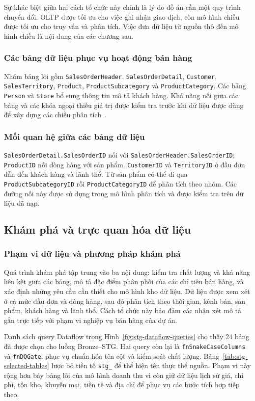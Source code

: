 Sự khác biệt giữa hai cách tổ chức này chính là lý do đồ án cần một quy trình chuyển đổi. OLTP được tối ưu cho việc ghi nhận giao dịch, còn mô hình chiều được tối ưu cho truy vấn và phân tích. Việc đưa dữ liệu từ nguồn thô đến mô hình chiều là nội dung của các chương sau.

\subsubsection{Các bảng dữ liệu phục vụ hoạt động bán hàng}
Nhóm bảng lõi gồm \texttt{SalesOrderHeader}, \texttt{SalesOrderDetail}, \texttt{Customer}, \texttt{SalesTerritory}, \texttt{Product}, \texttt{ProductSubcategory} và \texttt{ProductCategory}. Các bảng \texttt{Person} và \texttt{Store} bổ sung thông tin mô tả khách hàng. Khả năng nối giữa các bảng và các khóa ngoại thiếu giá trị được kiểm tra trước khi dữ liệu được dùng để xây dựng các chiều phân tích~\citep{aw-samples}.
\subsubsection{Mối quan hệ giữa các bảng dữ liệu}
\texttt{SalesOrderDetail.\allowbreak SalesOrderID} nối với \texttt{SalesOrderHeader.\allowbreak SalesOrderID}; \texttt{ProductID} nối dòng hàng với sản phẩm. \texttt{CustomerID} và \texttt{TerritoryID} ở đầu đơn dẫn đến khách hàng và lãnh thổ. Từ sản phẩm có thể đi qua \texttt{ProductSubcategoryID} rồi \texttt{ProductCategoryID} để phân tích theo nhóm. Các đường nối này được sử dụng trong mô hình phân tích và được kiểm tra trên dữ liệu đã nạp.
\subsection{Khám phá và trực quan hóa dữ liệu}
\subsubsection{Phạm vi dữ liệu và phương pháp khám phá}

Quá trình khám phá tập trung vào ba nội dung: kiểm tra chất lượng và khả năng liên kết giữa các bảng, mô tả đặc điểm phân phối của các chỉ tiêu bán hàng, và xác định những yêu cầu cần thiết cho mô hình kho dữ liệu. Dữ liệu được xem xét ở cả mức đầu đơn và dòng hàng, sau đó phân tích theo thời gian, kênh bán, sản phẩm, khách hàng và lãnh thổ. Cách tổ chức này bảo đảm các nhận xét mô tả gắn trực tiếp với phạm vi nghiệp vụ bán hàng của dự án.

Danh sách query Dataflow trong Hình~\ref{fig:stg-dataflow-queries} cho thấy 24 bảng đã được chọn cho luồng Bronze--STG. Hai query còn lại là \texttt{fnSnakeCaseColumns} và \texttt{fnDQGate}, phục vụ chuẩn hóa tên cột và kiểm soát chất lượng. Bảng~\ref{tab:stg-selected-tables} lược bỏ tiền tố \texttt{stg\_} để thể hiện tên thực thể nguồn. Phạm vi này rộng hơn bảy bảng lõi của mô hình doanh thu vì còn giữ dữ liệu lịch sử giá, chi phí, tồn kho, khuyến mại, tiền tệ và địa chỉ để phục vụ các bước tích hợp tiếp theo.

